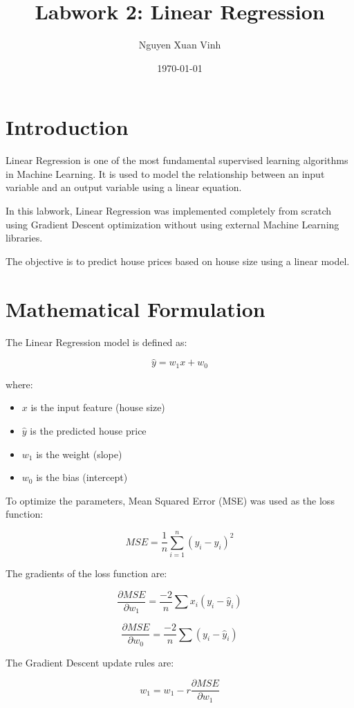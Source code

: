 \documentclass[12pt]{article}
\title{Labwork 2: Linear Regression}
\author{Nguyen Xuan Vinh}
\date{\today}
\begin{document}
\maketitle

\section{Introduction}

Linear Regression is one of the most fundamental supervised learning algorithms in Machine Learning. 
It is used to model the relationship between an input variable and an output variable using a linear equation.

In this labwork, Linear Regression was implemented completely from scratch using Gradient Descent optimization without using external Machine Learning libraries.

The objective is to predict house prices based on house size using a linear model.

\section{Mathematical Formulation}

The Linear Regression model is defined as:

\[
\hat{y} = w_1x + w_0
\]

where:

\begin{itemize}
    \item \(x\) is the input feature (house size)
    \item \(\hat{y}\) is the predicted house price
    \item \(w_1\) is the weight (slope)
    \item \(w_0\) is the bias (intercept)
\end{itemize}

To optimize the parameters, Mean Squared Error (MSE) was used as the loss function:

\[
MSE = \frac{1}{n}\sum_{i=1}^{n}(y_i - \hat{y}_i)^2
\]

The gradients of the loss function are:

\[
\frac{\partial MSE}{\partial w_1}
=
\frac{-2}{n}\sum x_i(y_i - \hat{y}_i)
\]

\[
\frac{\partial MSE}{\partial w_0}
=
\frac{-2}{n}\sum (y_i - \hat{y}_i)
\]

The Gradient Descent update rules are:

\[
w_1 = w_1 - r \frac{\partial MSE}{\partial w_1}
\]
\end{document}
